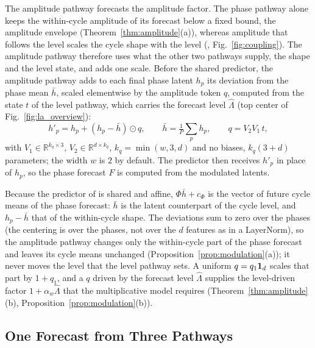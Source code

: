 {The amplitude pathway forecasts the amplitude factor. The phase pathway alone keeps the within-cycle amplitude of its forecast below a fixed bound, the amplitude envelope (Theorem~\ref{thm:amplitude}(a)), whereas amplitude that follows the level scales the cycle shape with the level (, Fig.~\ref{fig:coupling}). The amplitude pathway therefore uses what the other two pathways supply, the shape and the level state, and adds one scale. Before the shared predictor, the amplitude pathway adds to each final phase latent $h_p$ its deviation from the phase mean $\bar h$, scaled elementwise by the amplitude token $q$, computed from the state $t$ of the level pathway, which carries the forecast level $\hat\Lambda$ (top center of Fig.~\ref{fig:la_overview}):
\begin{equation}
h'_p=h_p+(h_p-\bar h)\odot q,\qquad \bar h=\tfrac1P\textstyle\sum_ph_p,\qquad q=V_2V_1\,t,
\label{eq:la_modulation}
\end{equation}
with $V_1\in\mathbb R^{k_q\times3}$, $V_2\in\mathbb R^{d\times k_q}$, $k_q=\min(w,3,d)$ and no biases, $k_q(3+d)$ parameters; the width $w$ is $2$ by default. The predictor then receives $h'_p$ in place of $h_p$, so the phase forecast $F$ is computed from the modulated latents.

Because the predictor of  is shared and affine, $\Phi\bar h+c_\Phi$ is the vector of future cycle means of the phase forecast: $\bar h$ is the latent counterpart of the cycle level, and $h_p-\bar h$ that of the within-cycle shape. The deviations sum to zero over the phases (the centering is over the phases, not over the $d$ features as in a LayerNorm), so the amplitude pathway changes only the within-cycle part of the phase forecast and leaves its cycle means unchanged (Proposition~\ref{prop:modulation}(a)); it never moves the level that the level pathway sets. A uniform $q=q_1\mathbf 1_d$ scales that part by $1+q_1$, and a $q$ driven by the forecast level $\hat\Lambda$ supplies the level-driven factor $1+\alpha_w\hat\Lambda$ that the multiplicative model requires (Theorem~\ref{thm:amplitude}(b), Proposition~\ref{prop:modulation}(b)).

\subsection{One Forecast from Three Pathways}
\label{sec:ext_init}

}
